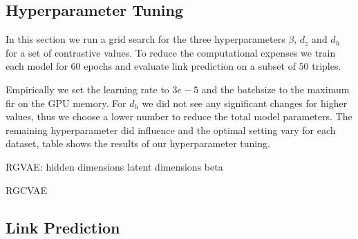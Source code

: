 
\subsection{Hyperparameter Tuning}

In this section we run a grid search for the three hyperparameters $\beta$, $d_z$ and $d_h$ for a set of contrastive values. To reduce the computational expenses we train each model for $60$ epochs and  evaluate link prediction on a subset of $50$ triples.

Empirically we set the learning rate to $3e-5$ and the batchsize to the maximum fir on the GPU memory. For $d_h$ we did not see any significant changes for higher values, thus we choose a lower number to reduce the total model parameters. The remaining hyperparameter did influence and the optimal setting vary for each dataset, table \Ref shows the results of our hyperparameter tuning.






RGVAE:
hidden dimensions
latent dimensions
beta


RGCVAE


\subsection{Link Prediction}




